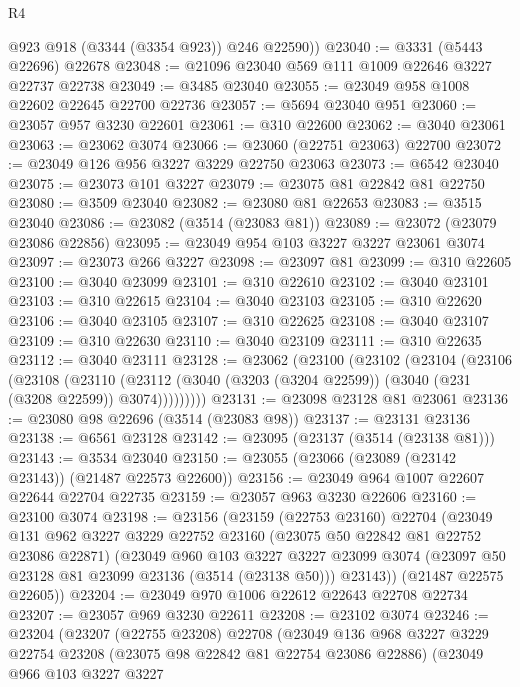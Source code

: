 \begin{lexlean}{R4}
\begin{coremodule}
        @923
        @918
        (@3344 (@3354 @923))
        @246
        @22590))
@23040 := @3331 (@5443 @22696) @22678
@23048 := @21096 @23040 @569 @111 @1009 @22646 @3227 @22737 @22738
@23049 := @3485 @23040
@23055 := @23049 @958 @1008 @22602 @22645 @22700 @22736
@23057 := @5694 @23040 @951
@23060 := @23057 @957 @3230 @22601
@23061 := @310 @22600
@23062 := @3040 @23061
@23063 := @23062 @3074
@23066 := @23060 (@22751 @23063) @22700
@23072 := @23049 @126 @956 @3227 @3229 @22750 @23063
@23073 := @6542 @23040
@23075 := @23073 @101 @3227
@23079 := @23075 @81 @22842 @81 @22750
@23080 := @3509 @23040
@23082 := @23080 @81 @22653
@23083 := @3515 @23040
@23086 := @23082 (@3514 (@23083 @81))
@23089 := @23072 (@23079 @23086 @22856)
@23095 := @23049 @954 @103 @3227 @3227 @23061 @3074
@23097 := @23073 @266 @3227
@23098 := @23097 @81
@23099 := @310 @22605
@23100 := @3040 @23099
@23101 := @310 @22610
@23102 := @3040 @23101
@23103 := @310 @22615
@23104 := @3040 @23103
@23105 := @310 @22620
@23106 := @3040 @23105
@23107 := @310 @22625
@23108 := @3040 @23107
@23109 := @310 @22630
@23110 := @3040 @23109
@23111 := @310 @22635
@23112 := @3040 @23111
@23128 := @23062
    (@23100
      (@23102
        (@23104
          (@23106
            (@23108
              (@23110
                (@23112 (@3040 (@3203 (@3204 @22599)) (@3040 (@231 (@3208 @22599)) @3074)))))))))
@23131 := @23098 @23128 @81 @23061
@23136 := @23080 @98 @22696 (@3514 (@23083 @98))
@23137 := @23131 @23136
@23138 := @6561 @23128
@23142 := @23095 (@23137 (@3514 (@23138 @81)))
@23143 := @3534 @23040
@23150 := @23055 (@23066 (@23089 (@23142 @23143)) (@21487 @22573 @22600))
@23156 := @23049 @964 @1007 @22607 @22644 @22704 @22735
@23159 := @23057 @963 @3230 @22606
@23160 := @23100 @3074
@23198 := @23156
    (@23159
      (@22753 @23160)
      @22704
      (@23049
        @131
        @962
        @3227
        @3229
        @22752
        @23160
        (@23075 @50 @22842 @81 @22752 @23086 @22871)
        (@23049
          @960
          @103
          @3227
          @3227
          @23099
          @3074
          (@23097 @50 @23128 @81 @23099 @23136 (@3514 (@23138 @50)))
          @23143))
      (@21487 @22575 @22605))
@23204 := @23049 @970 @1006 @22612 @22643 @22708 @22734
@23207 := @23057 @969 @3230 @22611
@23208 := @23102 @3074
@23246 := @23204
    (@23207
      (@22755 @23208)
      @22708
      (@23049
        @136
        @968
        @3227
        @3229
        @22754
        @23208
        (@23075 @98 @22842 @81 @22754 @23086 @22886)
        (@23049
          @966
          @103
          @3227
          @3227

\end{coremodule}
\end{lexlean}
